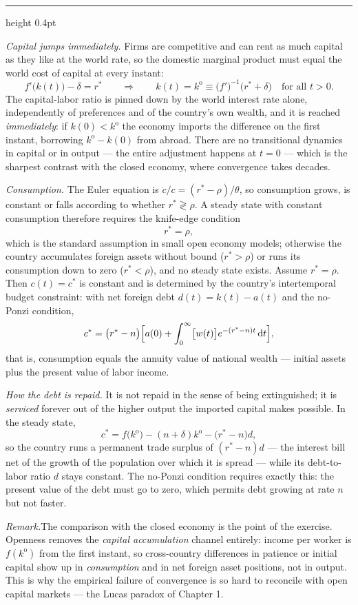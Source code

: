 \documentclass[11pt,letterpaper,reqno]{amsart}
\makeatletter
\newcommand{\dd}{\,\mathrm{d}}
\newcommand{\dt}[1]{\dot{#1}}
\newcommand{\as@head}[3]{%
  \par\addvspace{1.6ex}\penalty-200\relax
  \phantomsection
  \addcontentsline{toc}{subsection}{#1 #2\texorpdfstring{\ifx\relax#3\relax\else\quad #3\fi}{}}%
  {\color{RuleGrey}\hrule height 0.4pt}%
  \nobreak\vspace{0.8ex}\nobreak
  \noindent{\bfseries #1 #2}%
  \ifx\relax#3\relax\else\quad{\bfseries\itshape #3}\fi
  \par\nobreak\vspace{0.4ex}\nobreak
  \as@beginstatement
}
\newcommand{\as@beginstatement}{\begingroup\itshape\ignorespaces}
\newenvironment{aex}[2]{\as@head{Exercise}{#1}{#2}}{\par\addvspace{1.2ex}}
\newcommand{\rmk}[1]{%
  \par\vspace{0.6ex}%
  {\small\noindent\textit{Remark.}\hspace{0.5em}#1\par}%
  \vspace{0.4ex}%
}
\renewcommand{\as@beginstatement}{\ignorespaces}
\makeatother
\begin{document}
\begin{aex}{8.36}{}
\emph{Capital jumps immediately.}  Firms are competitive and can rent as much capital as they like at the
world rate, so the domestic marginal product must equal the world cost of capital at every instant:
\[
f'\bigl(k(t)\bigr)-\delta=r^{*}
\qquad\Longrightarrow\qquad
k(t)=k^{\text{o}}\equiv\bigl(f'\bigr)^{-1}\bigl(r^{*}+\delta\bigr)\quad\text{for all }t>0 .
\]
The capital-labor ratio is pinned down by the world interest rate alone, independently of preferences and
of the country's own wealth, and it is reached \emph{immediately}: if $k(0)<k^{\text{o}}$ the economy
imports the difference on the first instant, borrowing $k^{\text{o}}-k(0)$ from abroad.  There are no
transitional dynamics in capital or in output --- the entire adjustment happens at $t=0$ --- which is the
sharpest contrast with the closed economy, where convergence takes decades.

\emph{Consumption.}  The Euler equation is $\dt c/c=(r^{*}-\rho)/\theta$, so consumption grows, is constant
or falls according to whether $r^{*}\gtrless\rho$.  A steady state with constant consumption therefore
requires the knife-edge condition
\[
r^{*}=\rho ,
\]
which is the standard assumption in small open economy models; otherwise the country accumulates foreign
assets without bound ($r^{*}>\rho$) or runs its consumption down to zero ($r^{*}<\rho$), and no steady
state exists.  Assume $r^{*}=\rho$.  Then $c(t)=c^{*}$ is constant and is determined by the country's
intertemporal budget constraint: with net foreign debt $d(t)=k(t)-a(t)$ and the no-Ponzi condition,
\[
c^{*}=\bigl(r^{*}-n\bigr)\Bigl[a(0)+\int_0^{\infty}\bigl[w(t)\bigr]e^{-(r^{*}-n)t}\dd t\Bigr] ,
\]
that is, consumption equals the annuity value of national wealth --- initial assets plus the present value
of labor income.

\emph{How the debt is repaid.}  It is not repaid in the sense of being extinguished; it is \emph{serviced}
forever out of the higher output the imported capital makes possible.  In the steady state,
\[
c^{*}=f\bigl(k^{\text{o}}\bigr)-(n+\delta)k^{\text{o}}-\bigl(r^{*}-n\bigr)d ,
\]
so the country runs a permanent trade surplus of $(r^{*}-n)d$ --- the interest bill net of the growth of
the population over which it is spread --- while its debt-to-labor ratio $d$ stays constant.  The no-Ponzi
condition requires exactly this: the present value of the debt must go to zero, which permits debt growing
at rate $n$ but not faster.

\rmk{The comparison with the closed economy is the point of the exercise.  Openness removes the
\emph{capital accumulation} channel entirely: income per worker is $f(k^{\text{o}})$ from the first instant,
so cross-country differences in patience or initial capital show up in \emph{consumption} and in net
foreign asset positions, not in output.  This is why the empirical failure of convergence is so hard to
reconcile with open capital markets --- the Lucas paradox of Chapter 1.}
\end{aex}
\end{document}
